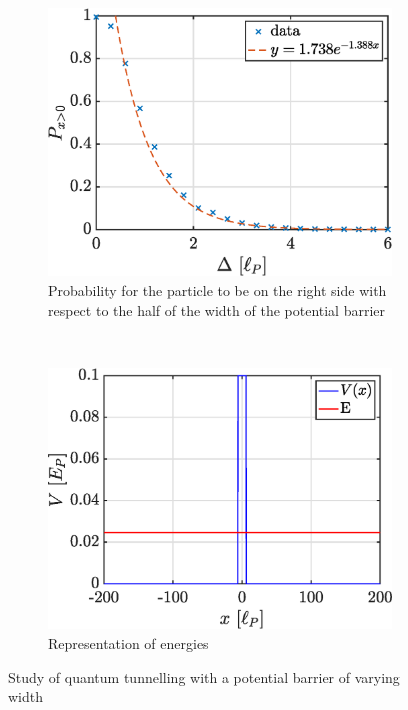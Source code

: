 \documentclass[a4paper,12pt,twoside]{article}
\begin{document}
        \begin{figure}[h]
          \centering
          \begin{subfigure}[t]{0.45\textwidth}
            \includegraphics[width=\textwidth]{graphs/v_conv_delta.eps}
            \caption{Probability for the particle to be on the right side with respect to the half of the width of the potential barrier}
            \label{fig:v_conv_delta}
          \end{subfigure}
          ~
          \begin{subfigure}[t]{0.45\textwidth}
            \includegraphics[width=\textwidth]{graphs/v_conv_delta_pot.eps}
            \caption{Representation of energies}
            \label{fig:v_conv_delta_pot}
          \end{subfigure}
          \caption{Study of quantum tunnelling with a potential barrier of varying width}
          \label{fig:v_conv_delta}
        \end{figure}
\end{document}
